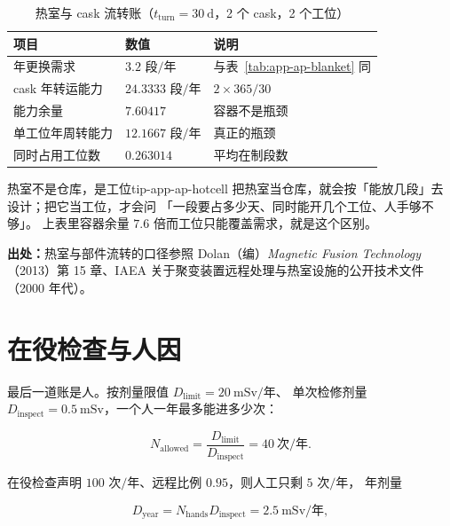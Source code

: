 \begin{table}[htbp]
\centering
\small
\caption{热室与 cask 流转账（$t_{\text{turn}} = 30\ \mathrm{d}$，2 个 cask，2 个工位）}
\label{tab:app-ap-hotcell}
\setlength{\tabcolsep}{4pt}
\begin{tabular}{p{5.8cm}p{4.2cm}p{5.6cm}}
\toprule
项目 & 数值 & 说明 \\
\midrule
年更换需求 & $3.2$ 段$/$年 & 与表~\ref{tab:app-ap-blanket} 同 \\
cask 年转运能力 & $24.3333$ 段$/$年 & $2 \times 365/30$ \\
能力余量 & $7.60417$ & 容器不是瓶颈 \\
单工位年周转能力 & $12.1667$ 段$/$年 & 真正的瓶颈 \\
同时占用工位数 & $0.263014$ & 平均在制段数 \\
\bottomrule
\end{tabular}
\end{table}

\begin{tip}{热室不是仓库，是工位}{tip-app-ap-hotcell}
把热室当仓库，就会按「能放几段」去设计；把它当工位，才会问
「一段要占多少天、同时能开几个工位、人手够不够」。
上表里容器余量 $7.6$ 倍而工位只能覆盖需求，就是这个区别。
\end{tip}

{\footnotesize
\textbf{出处：}热室与部件流转的口径参照 Dolan（编）\textit{Magnetic Fusion Technology}
（2013）第 15 章、IAEA 关于聚变装置远程处理与热室设施的公开技术文件（2000 年代）。
}

\section{在役检查与人因}
\label{sec:app-ap-human}

最后一道账是人。按剂量限值 $D_{\text{limit}} = 20\ \mathrm{mSv}/$年、
单次检修剂量 $D_{\text{inspect}} = 0.5\ \mathrm{mSv}$，一个人一年最多能进多少次：

\begin{equation}
N_{\text{allowed}} = \frac{D_{\text{limit}}}{D_{\text{inspect}}} = 40\ \text{次}/\text{年}.
\label{eq:app-ap-human}
\end{equation}

在役检查声明 $100$ 次$/$年、远程比例 $0.95$，则人工只剩 $5$ 次$/$年，
年剂量

\begin{equation}
D_{\text{year}} = N_{\text{hands}}D_{\text{inspect}} = 2.5\ \mathrm{mSv}/\text{年},
\label{eq:app-ap-budget}
\end{equation}

